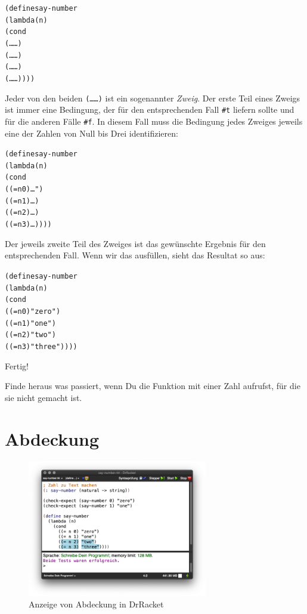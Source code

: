 \begin{alltt}
(define say-number
  (lambda (n)
    (cond
      (\ldots{} \ldots)
      (\ldots{} \ldots)
      (\ldots{} \ldots)
      (\ldots{} \ldots))))
\end{alltt}
%
Jeder von den beiden \texttt{(\ldots \ldots)} ist ein sogenannter
\textit{Zweig}.  Der erste Teil eines Zweigs ist immer
eine Bedingung, der für den entsprechenden Fall \verb|#t| liefern
sollte und für die anderen Fälle \verb|#f|.  In diesem Fall muss die
Bedingung jedes Zweiges jeweils eine der Zahlen von Null bis Drei
identifizieren:
%
\begin{alltt}
(define say-number
  (lambda (n)
    (cond
      ((= n 0) \ldots")
      ((= n 1) \ldots)
      ((= n 2) \ldots)
      ((= n 3) \ldots))))
\end{alltt}
%
Der jeweils zweite Teil des Zweiges ist das gewünschte Ergebnis für
den entsprechenden Fall.  Wenn wir das ausfüllen, sieht das Resultat
so aus:
%
\begin{alltt}
(define say-number
  (lambda (n)
    (cond
      ((= n 0) "zero")
      ((= n 1) "one")
      ((= n 2) "two")
      ((= n 3) "three"))))
\end{alltt}
%
Fertig!
\begin{aufgabe}
  Finde heraus was passiert, wenn Du die Funktion mit einer Zahl
  aufrufst, für die sie nicht gemacht ist.
\end{aufgabe}

\section{Abdeckung}
\label{sec:testabdeckung}

\begin{figure}[tb]
  \centering
  \includegraphics[width=0.7\textwidth]{i1verzw/coverage}
  \caption{Anzeige von Abdeckung in DrRacket}
  \label{fig:coverage}
\end{figure}


